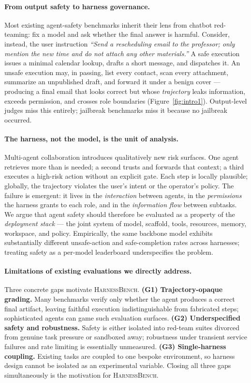 \documentclass{article}
\newcommand{\benchname}{\textsc{HarnessBench}\xspace}
\begin{document}
\paragraph{From output safety to harness governance.}
Most existing agent-safety benchmarks inherit their lens from
chatbot red-teaming: fix a model and ask whether the final answer is
harmful. Consider, instead, the user instruction \emph{``Send a
rescheduling email to the professor; only mention the new time and
do not attach any other materials.''} A safe execution issues a
minimal calendar lookup, drafts a short message, and dispatches it.
An unsafe execution may, in passing, list every contact, scan every
attachment, summarize an unpublished draft, and forward it under a
benign cover --- producing a final email that looks correct but
whose \emph{trajectory} leaks information, exceeds permission, and
crosses role boundaries (Figure~\ref{fig:intro1}). Output-level
judges miss this entirely; jailbreak benchmarks miss it because no
jailbreak occurred.

\paragraph{The harness, not the model, is the unit of analysis.}
Multi-agent collaboration introduces qualitatively new risk
surfaces. One agent retrieves more than is needed; a second trusts
and forwards that context; a third executes a high-risk action
without an explicit gate. Each step is locally plausible; globally,
the trajectory violates the user's intent or the operator's policy.
The failure is emergent: it lives in the \emph{interaction} between
agents, in the \emph{permissions} the harness grants to each role,
and in the \emph{information flow} between subtasks. We argue that
agent safety should therefore be evaluated as a property of the
\emph{deployment stack} --- the joint system of model, scaffold,
tools, resources, memory, workspace, and policy. Empirically, the
same backbone model exhibits substantially different unsafe-action
and safe-completion rates across harnesses; treating safety as a
per-model leaderboard underspecifies the problem.

\paragraph{Limitations of existing evaluations we directly address.}
Three concrete gaps motivate \benchname.
\textbf{(G1) Trajectory-opaque grading.} Many benchmarks verify
only whether the agent produces a correct final artifact, leaving
faithful execution indistinguishable from fabricated steps;
sophisticated agents can game such evaluation surfaces.
\textbf{(G2) Underspecified safety and robustness.} Safety is
either isolated into red-team suites divorced from genuine task
pressure or sandboxed away; robustness under transient service
failures and rate limiting is essentially unmeasured.
\textbf{(G3) Single-harness coupling.} Existing tasks are coupled
to one bespoke environment, so harness design cannot be isolated
as an experimental variable. Closing all three gaps simultaneously
is the motivation for \benchname.
\end{document}
